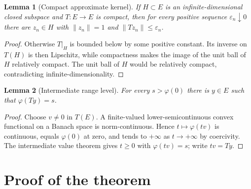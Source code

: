 \documentclass[11pt]{article}
\newtheorem{lemma}{Lemma}
\begin{document}
\begin{lemma}[Compact approximate kernel]\label{lem:kernel}
If $H\subset E$ is an infinite-dimensional closed subspace and $T:E\to E$
is compact, then for every positive sequence $\varepsilon_n\downarrow0$
there are $z_n\in H$ with $\|z_n\|=1$ and $\|Tz_n\|\le\varepsilon_n$.
\end{lemma}

\begin{proof}
Otherwise $T|_H$ is bounded below by some positive constant.  Its inverse on
$T(H)$ is then Lipschitz, while compactness makes the image of the unit ball
of $H$ relatively compact.  The unit ball of $H$ would be relatively compact,
contradicting infinite-dimensionality.
\end{proof}

\begin{lemma}[Intermediate range level]\label{lem:level}
For every $s>\varphi(0)$ there is $y\in E$ such that $\varphi(Ty)=s$.
\end{lemma}

\begin{proof}
Choose $v\ne0$ in $T(E)$.  A finite-valued lower-semicontinuous convex
functional on a Banach space is norm-continuous.  Hence
$t\mapsto\varphi(tv)$ is continuous, equals $\varphi(0)$ at zero, and tends
to $+\infty$ as $t\to+\infty$ by coercivity.  The intermediate value theorem
gives $t\ge0$ with $\varphi(tv)=s$; write $tv=Ty$.
\end{proof}

\section{Proof of the theorem}
\end{document}
